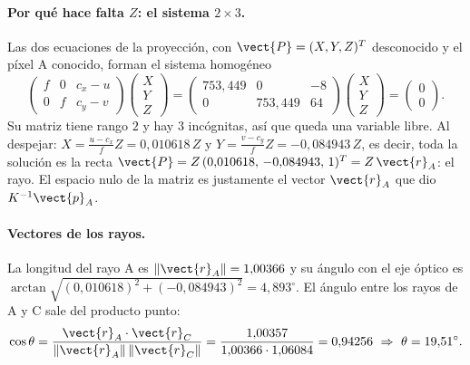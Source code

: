 \paragraph{Por qué hace falta $Z$: el sistema $2\times3$.} Las dos ecuaciones de la proyección, con $\vect{P}=(X,Y,Z)^T$ desconocido y
el píxel A conocido, forman el sistema homogéneo
\begin{equation}
\begin{pmatrix}f&0&c_x-u\\0&f&c_y-v\end{pmatrix}\begin{pmatrix}X\\Y\\Z\end{pmatrix}=
\begin{pmatrix} 753{,}449 & 0 & -8 \\ 0 & 753{,}449 & 64 \end{pmatrix}\begin{pmatrix}X\\Y\\Z\end{pmatrix}=\begin{pmatrix}0\\0\end{pmatrix}.
\end{equation}
Su matriz tiene rango $2$ y hay $3$ incógnitas, así que queda una variable libre. Al despejar:
$X=\tfrac{u-c_x}{f}Z=0{,}010618\,Z$ y $Y=\tfrac{v-c_y}{f}Z=-0{,}084943\,Z$, es decir, toda la solución es la recta
$\vect{P}=Z\,(0{,}010618,\,-0{,}084943,\,1)^T=Z\,\vect{r}_A$: el rayo. El espacio nulo de la matriz es justamente el vector $\vect{r}_A$ que dio $K^{-1}\vect{p}_A$.

\paragraph{Vectores de los rayos.} La longitud del rayo A es $\lVert\vect{r}_A\rVert=1{,}00366$ y su ángulo con el eje óptico es
$\arctan\sqrt{(0{,}010618)^2+(-0{,}084943)^2}=4{,}893^\circ$. El ángulo entre los rayos de A y C sale del producto punto:
\begin{equation}
\cos\theta=\frac{\vect{r}_A\cdot\vect{r}_C}{\lVert\vect{r}_A\rVert\,\lVert\vect{r}_C\rVert}=
\frac{1{,}00357}{1{,}00366\cdot1{,}06084}=0{,}94256\ \Rightarrow\ \theta=19{,}51^\circ .
\end{equation}

